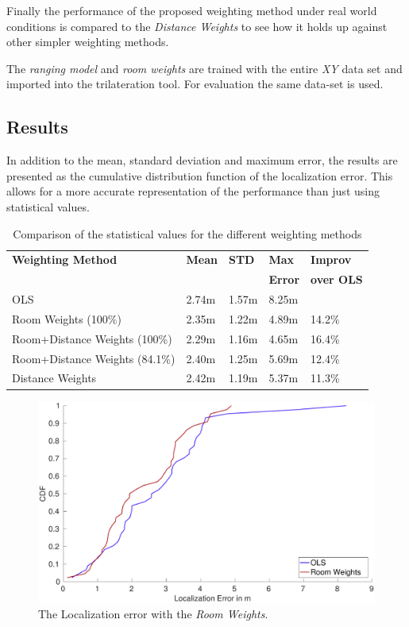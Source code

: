 Finally the performance of the proposed weighting method under real world conditions is compared to the \emph{Distance Weights} to see how it holds up against other simpler weighting methods.

The \emph{ranging model} and \emph{room weights} are trained with the entire \emph{XY} data set and imported into the trilateration tool. For evaluation the same data-set is used.

\subsection{Results}
In addition to the mean, standard deviation and maximum error, the results are presented as the cumulative distribution function of the localization error. This allows for a more accurate representation of the performance than just using statistical values.

\begin{table}[hb]
\centering
\begin{tabular}{l l l l l}
\toprule
\textbf{Weighting Method}&\textbf{Mean}&\textbf{STD}&\textbf{Max}&\textbf{Improv}\\
&&\textbf{}&\textbf{Error}&\textbf{over OLS}\\
\midrule
OLS&2.74m&1.57m&8.25m&\\
Room Weights (100\%)&2.35m&1.22m&4.89m&14.2\%\\
Room+Distance Weights (100\%)&2.29m&1.16m&4.65m&16.4\%\\
Room+Distance Weights (84.1\%)&2.40m&1.25m&5.69m&12.4\%\\
Distance Weights&2.42m&1.19m&5.37m&11.3\%\\
\bottomrule
\end{tabular}
\caption[Weighting method comparison]{Comparison of the statistical values for the different weighting methods}
\label{tab:WeightingStatisticalValues}
\end{table}

\begin{figure}[p]
\centering
\includegraphics[width=\textwidth]{Figures/WeightingCDF_RW}
\decoRule
\caption[Weighting method comparison]{The Localization error with the \emph{Room Weights}.}
\label{fig:WeightingCDFRoom}
\end{figure}

